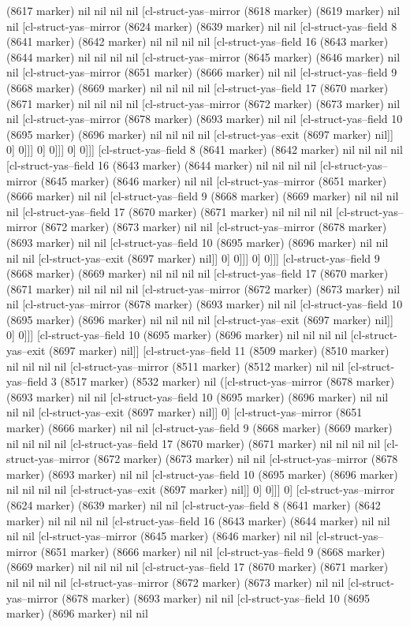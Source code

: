 {{(8617 marker) nil nil nil nil [cl-struct-yas--mirror (8618 marker) (8619 marker) nil nil [cl-struct-yas--mirror (8624 marker) (8639 marker) nil nil [cl-struct-yas--field 8 (8641 marker) (8642 marker) nil nil nil nil [cl-struct-yas--field 16 (8643 marker) (8644 marker) nil nil nil nil [cl-struct-yas--mirror (8645 marker) (8646 marker) nil nil [cl-struct-yas--mirror (8651 marker) (8666 marker) nil nil [cl-struct-yas--field 9 (8668 marker) (8669 marker) nil nil nil nil [cl-struct-yas--field 17 (8670 marker) (8671 marker) nil nil nil nil [cl-struct-yas--mirror (8672 marker) (8673 marker) nil nil [cl-struct-yas--mirror (8678 marker) (8693 marker) nil nil [cl-struct-yas--field 10 (8695 marker) (8696 marker) nil nil nil nil [cl-struct-yas--exit (8697 marker) nil]] 0] 0]]] 0] 0]]] 0] 0]]] [cl-struct-yas--field 8 (8641 marker) (8642 marker) nil nil nil nil [cl-struct-yas--field 16 (8643 marker) (8644 marker) nil nil nil nil [cl-struct-yas--mirror (8645 marker) (8646 marker) nil nil [cl-struct-yas--mirror (8651 marker) (8666 marker) nil nil [cl-struct-yas--field 9 (8668 marker) (8669 marker) nil nil nil nil [cl-struct-yas--field 17 (8670 marker) (8671 marker) nil nil nil nil [cl-struct-yas--mirror (8672 marker) (8673 marker) nil nil [cl-struct-yas--mirror (8678 marker) (8693 marker) nil nil [cl-struct-yas--field 10 (8695 marker) (8696 marker) nil nil nil nil [cl-struct-yas--exit (8697 marker) nil]] 0] 0]]] 0] 0]]] [cl-struct-yas--field 9 (8668 marker) (8669 marker) nil nil nil nil [cl-struct-yas--field 17 (8670 marker) (8671 marker) nil nil nil nil [cl-struct-yas--mirror (8672 marker) (8673 marker) nil nil [cl-struct-yas--mirror (8678 marker) (8693 marker) nil nil [cl-struct-yas--field 10 (8695 marker) (8696 marker) nil nil nil nil [cl-struct-yas--exit (8697 marker) nil]] 0] 0]]] [cl-struct-yas--field 10 (8695 marker) (8696 marker) nil nil nil nil [cl-struct-yas--exit (8697 marker) nil]] [cl-struct-yas--field 11 (8509 marker) (8510 marker) nil nil nil nil [cl-struct-yas--mirror (8511 marker) (8512 marker) nil nil [cl-struct-yas--field 3 (8517 marker) (8532 marker) nil ([cl-struct-yas--mirror (8678 marker) (8693 marker) nil nil [cl-struct-yas--field 10 (8695 marker) (8696 marker) nil nil nil nil [cl-struct-yas--exit (8697 marker) nil]] 0] [cl-struct-yas--mirror (8651 marker) (8666 marker) nil nil [cl-struct-yas--field 9 (8668 marker) (8669 marker) nil nil nil nil [cl-struct-yas--field 17 (8670 marker) (8671 marker) nil nil nil nil [cl-struct-yas--mirror (8672 marker) (8673 marker) nil nil [cl-struct-yas--mirror (8678 marker) (8693 marker) nil nil [cl-struct-yas--field 10 (8695 marker) (8696 marker) nil nil nil nil [cl-struct-yas--exit (8697 marker) nil]] 0] 0]]] 0] [cl-struct-yas--mirror (8624 marker) (8639 marker) nil nil [cl-struct-yas--field 8 (8641 marker) (8642 marker) nil nil nil nil [cl-struct-yas--field 16 (8643 marker) (8644 marker) nil nil nil nil [cl-struct-yas--mirror (8645 marker) (8646 marker) nil nil [cl-struct-yas--mirror (8651 marker) (8666 marker) nil nil [cl-struct-yas--field 9 (8668 marker) (8669 marker) nil nil nil nil [cl-struct-yas--field 17 (8670 marker) (8671 marker) nil nil nil nil [cl-struct-yas--mirror (8672 marker) (8673 marker) nil nil [cl-struct-yas--mirror (8678 marker) (8693 marker) nil nil [cl-struct-yas--field 10 (8695 marker) (8696 marker) nil nil }}
